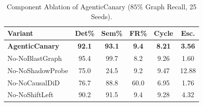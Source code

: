 \begin{table}[t]
\centering
\caption{Component Ablation of AgenticCanary ($85\%$ Graph Recall, 25 Seeds).}
\label{tab:acv_ablation}
\begin{tabular}{lccccc}
\toprule
\textbf{Variant} & \textbf{Det\%} & \textbf{Sem\%} & \textbf{FR\%} & \textbf{Cycle} & \textbf{Esc.} \\
\midrule
\textbf{AgenticCanary} & \textbf{92.1} & \textbf{93.1} & \textbf{9.4} & \textbf{8.21} & \textbf{3.56} \\
No-NoBlastGraph & 95.4 & 99.7 & 8.2 & 9.26 & 1.60 \\
No-NoShadowProbe & 75.0 & 24.5 & 9.2 & 9.47 & 12.88 \\
No-NoCausalDiD & 76.7 & 88.8 & 60.0 & 6.95 & 1.76 \\
No-NoShiftLeft & 90.2 & 91.5 & 9.4 & 9.28 & 4.32 \\
\bottomrule
\end{tabular}
\end{table}
